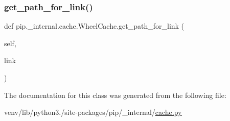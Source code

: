 \subsubsection{\texorpdfstring{get\+\_\+path\+\_\+for\+\_\+link()}{get\_path\_for\_link()}}
{\footnotesize\ttfamily def pip.\+\_\+internal.\+cache.\+Wheel\+Cache.\+get\+\_\+path\+\_\+for\+\_\+link (\begin{DoxyParamCaption}\item[{}]{self,  }\item[{}]{link }\end{DoxyParamCaption})}



The documentation for this class was generated from the following file\+:\begin{DoxyCompactItemize}
\item 
venv/lib/python3./site-\/packages/pip/\+\_\+internal/\hyperlink{__internal_2cache_8py}{cache.\+py}\end{DoxyCompactItemize}
